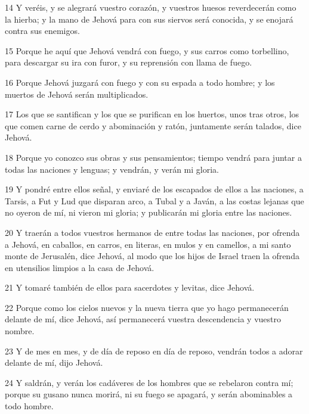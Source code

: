 \par 14 Y veréis, y se alegrará vuestro corazón, y vuestros huesos reverdecerán como la hierba; y la mano de Jehová para con sus siervos será conocida, y se enojará contra sus enemigos.
\par 15 Porque he aquí que Jehová vendrá con fuego, y sus carros como torbellino, para descargar su ira con furor, y su reprensión con llama de fuego.
\par 16 Porque Jehová juzgará con fuego y con su espada a todo hombre; y los muertos de Jehová serán multiplicados.
\par 17 Los que se santifican y los que se purifican en los huertos, unos tras otros, los que comen carne de cerdo y abominación y ratón, juntamente serán talados, dice Jehová.
\par 18 Porque yo conozco sus obras y sus pensamientos; tiempo vendrá para juntar a todas las naciones y lenguas; y vendrán, y verán mi gloria.
\par 19 Y pondré entre ellos señal, y enviaré de los escapados de ellos a las naciones, a Tarsis, a Fut y Lud que disparan arco, a Tubal y a Javán, a las costas lejanas que no oyeron de mí, ni vieron mi gloria; y publicarán mi gloria entre las naciones.
\par 20 Y traerán a todos vuestros hermanos de entre todas las naciones, por ofrenda a Jehová, en caballos, en carros, en literas, en mulos y en camellos, a mi santo monte de Jerusalén, dice Jehová, al modo que los hijos de Israel traen la ofrenda en utensilios limpios a la casa de Jehová.
\par 21 Y tomaré también de ellos para sacerdotes y levitas, dice Jehová.
\par 22 Porque como los cielos nuevos y la nueva tierra que yo hago permanecerán delante de mí, dice Jehová, así permanecerá vuestra descendencia y vuestro nombre.
\par 23 Y de mes en mes, y de día de reposo en día de reposo, vendrán todos a adorar delante de mí, dijo Jehová.
\par 24 Y saldrán, y verán los cadáveres de los hombres que se rebelaron contra mí; porque su gusano nunca morirá, ni su fuego se apagará, y serán abominables a todo hombre. 

